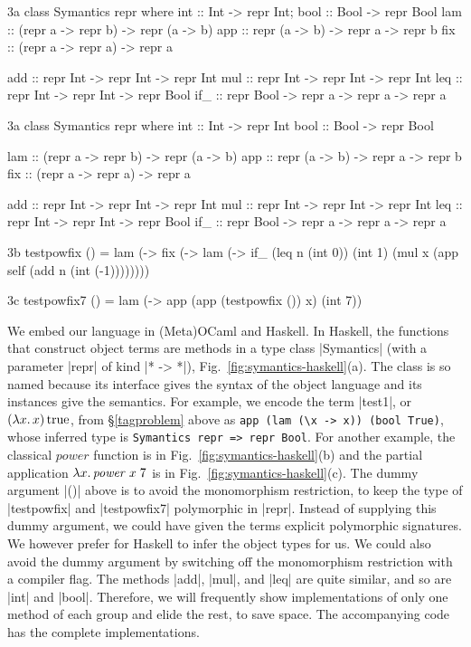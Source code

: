 \ifshort
\begin{SaveVerbatim}{3a}
class Symantics repr where
  int :: Int  -> repr Int;       bool :: Bool -> repr Bool
  lam :: (repr a -> repr b) -> repr (a -> b)
  app :: repr (a -> b) -> repr a -> repr b
  fix :: (repr a -> repr a) -> repr a

  add :: repr Int -> repr Int -> repr Int
  mul :: repr Int -> repr Int -> repr Int
  leq :: repr Int -> repr Int -> repr Bool
  if_ :: repr Bool -> repr a -> repr a -> repr a
\end{SaveVerbatim}
\else
\begin{SaveVerbatim}{3a}
class Symantics repr where
  int  :: Int  -> repr Int
  bool :: Bool -> repr Bool

  lam :: (repr a -> repr b) -> repr (a -> b)
  app :: repr (a -> b) -> repr a -> repr b
  fix :: (repr a -> repr a) -> repr a

  add :: repr Int -> repr Int -> repr Int
  mul :: repr Int -> repr Int -> repr Int
  leq :: repr Int -> repr Int -> repr Bool
  if_ :: repr Bool -> repr a -> repr a -> repr a
\end{SaveVerbatim}
\fi
\begin{SaveVerbatim}{3b}
testpowfix () = lam (\x -> fix (\self -> lam (\n ->
                 if_ (leq n (int 0)) (int 1)
                     (mul x (app self (add n (int (-1))))))))
\end{SaveVerbatim}
\begin{SaveVerbatim}{3c}
testpowfix7 () = lam (\x -> app (app (testpowfix ()) x) (int 7))
\end{SaveVerbatim}

We embed our language in (Meta)OCaml and Haskell.  In Haskell,
the functions that construct object terms are methods in a type class
|Symantics| (with a parameter |repr| of kind |* -> *|)\ifshort,
Fig.~\ref{fig:symantics-haskell}(a)\fi. The class is so named
because its interface gives the syntax of the object language and its
instances give the semantics.
\ifshort\else{}\fi
For example, we encode the term |test1|, or $(\mathopen{\lambda\mathord{x}.\,}x)\mathinner{\mathrm{true}}$, from
\S\ref{tagproblem} above as \texttt{app (lam (\textbackslash x -> x)) (bool True)},
whose inferred type is \texttt{Symantics repr => repr Bool}.
For another example, the classical $\mathit{power}$ function is
\ifshort in Fig.~\ref{fig:symantics-haskell}(b)
\else{}\fi
and the partial application $\mathopen{\lambda\mathord{x}.\,} \mathit{power}\;x\;7$ is
\ifshort in Fig.~\ref{fig:symantics-haskell}(c).
\else{}\fi
The dummy argument |()| above is to avoid the monomorphism
restriction, to keep the type of |testpowfix| and |testpowfix7|
polymorphic in |repr|. Instead of supplying this dummy
argument, we could have given the terms explicit polymorphic
signatures.  We however prefer for
Haskell to infer the object types for us. We could also
avoid the dummy argument by switching off the monomorphism restriction
with a compiler flag.
The methods |add|, |mul|, and |leq| are quite similar, and so are
|int| and |bool|. Therefore, we will frequently show implementations of
only one method of each group and elide the rest, to save space. The
accompanying code has the complete implementations.

